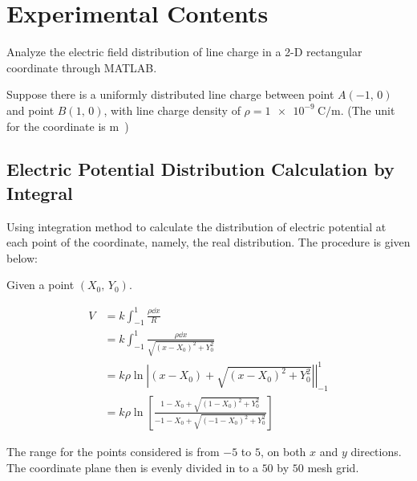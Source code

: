 \documentclass[journal]{IEEEtran}
\begin{document}
\section{Experimental Contents}

Analyze the electric field distribution of line charge in a 2-D rectangular coordinate through MATLAB.

Suppose there is a uniformly distributed line charge between point $A(-1,\,0)$ and point $B(1,\,0)$, with line charge density of $\rho = \SI[per-mode=symbol]{1e-9}{\coulomb\per\meter}$. (The unit for the coordinate is \si\meter)

\subsection{Electric Potential Distribution Calculation by Integral}

Using integration method to calculate the distribution of electric potential at each point of the coordinate, namely, the real distribution. The procedure is given below:

Given a point $(X_0,\, Y_0)$.

\begin{equation}
    \begin{aligned}
        V & =
        k\int_{-1}^1 \frac{\rho\dd{x}}{R}                                           \\ & =
        k\int_{-1}^1 \frac{\rho\dd{x}}{\sqrt{(x - X_0)^2 + Y_0^2}}                  \\ & =
        k\rho\ln\left.\left|(x-X_0) + \sqrt{(x-X_0)^2 + Y_0^2}\right|\right|_{-1}^1 \\ & =
        k\rho\ln\left[
            \frac{1 - X_0 + \sqrt{(1-X_0)^2 + Y_0^2}}{-1-X_0 + \sqrt{(-1-X_0)^2 + Y_0^2}}
            \right]
    \end{aligned}
\end{equation}

The range for the points considered is from $-5$ to $5$, on both $x$ and $y$ directions. The coordinate plane then is evenly divided in to a $50$ by $50$ mesh grid.
\end{document}
